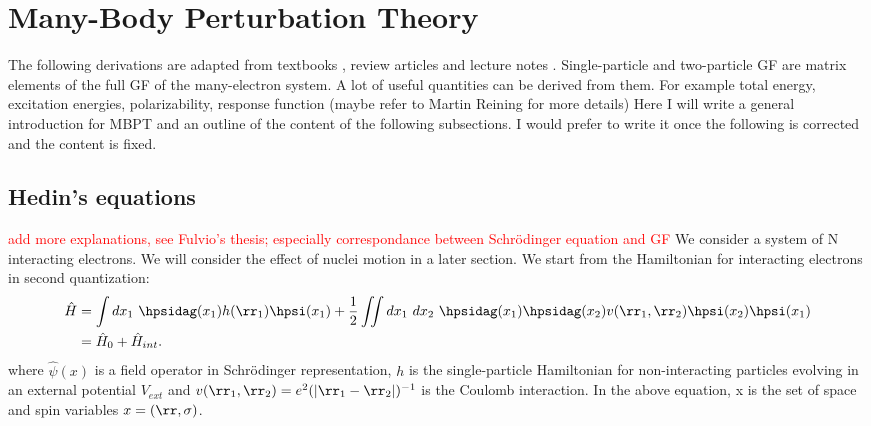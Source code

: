 
%
%

\section{Many-Body Perturbation Theory}
The following derivations are adapted from textbooks \cite{martin2016interacting,stefanucci2013nonequilibrium}, review articles \cite{strinati1988application,aryasetiawan1998gw,giustino2017review} and lecture notes \cite{JulienToulouseNotes}.
Single-particle and two-particle GF are matrix elements of the full GF of the many-electron system. A lot of useful quantities can be derived from them. For example total energy, excitation energies, polarizability, response function (maybe refer to Martin Reining for more details)
Here I will write a general introduction for MBPT and an outline of the content of the following subsections. I would prefer to write it once the following is corrected and the content is fixed.


\subsection{Hedin's equations}
\textcolor{red}{add more explanations, see Fulvio's thesis; especially correspondance between Schrödinger equation and GF}
We consider a system of N interacting electrons. We will consider the effect of nuclei motion in a later section.
We start from the Hamiltonian for interacting electrons in second quantization:
\begin{align}
\begin{split}
 	\hat{H} &= \int dx_1 \ \hpsidag(x_1) h(\rr_1) \hpsi(x_1) + \frac{1}{2} \iint dx_1 \  dx_2 \ \hpsidag(x_1) \hpsidag(x_2) v(\rr_1,\rr_2) \hpsi(x_2)\hpsi(x_1) \\
		&= \hat{H}_0 + \hat{H}_{int}.
\end{split}
\end{align}
where $\hat{\psi}(x)$ is a field operator in Schrödinger representation, $h$ is the single-particle Hamiltonian for non-interacting particles evolving in an external potential $V_{ext}$ and $v(\rr_1,\rr_2) = e^2 (\left| \rr_1 - \rr_2 \right|)^{-1}$ is the Coulomb interaction. In the above equation, x is the set of space and spin variables $x = (\rr, \sigma)$.
%

